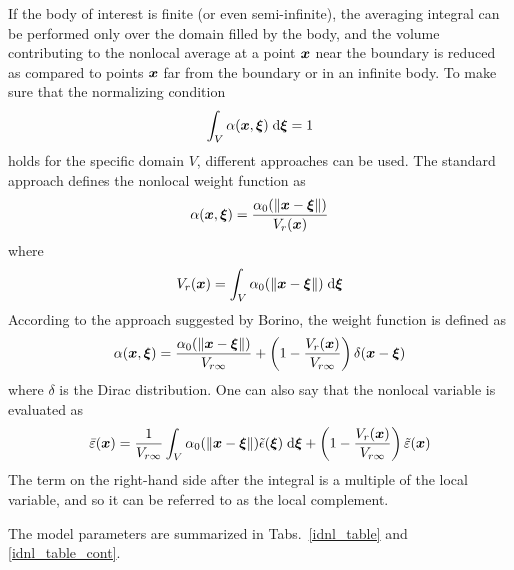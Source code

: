 \documentclass[a4paper]{article}
\newcommand{\mbf}[1]{\mbox{\boldmath$#1$}}
\begin{document}
If the body of interest is finite (or even semi-infinite), the averaging
integral can be performed only over
the domain filled by the body, and the volume contributing to the nonlocal
average at a point $\mbf{x}$ near the boundary is reduced as compared to 
points  $\mbf{x}$ far from the boundary or in an infinite body. To make sure
that the normalizing condition
$$
\int_{V} \alpha(\mbf{x},\mbf{\xi})\;{\rm d}\mbf{\xi} = 1
$$
holds for the specific domain $V$, different approaches can be used.
The standard approach defines the nonlocal weight function as  
$$
\alpha(\mbf{x},\mbf{\xi})=\frac{\alpha_0(\Vert\mbf{x}-\mbf{\xi}\Vert)}{V_r(\mbf{x})}
$$
where
$$
V_r(\mbf{x}) = \int_{V} \alpha_0(\Vert\mbf{x}-\mbf{\xi}\Vert)\;{\rm d}\mbf{\xi} 
$$
According to the approach suggested by Borino, the weight function is defined as
$$
\alpha(\mbf{x},\mbf{\xi})=\frac{\alpha_0(\Vert\mbf{x}-\mbf{\xi}\Vert)}{V_{r\infty}} + \left(1-\frac{V_r(\mbf{x})}{V_{r\infty}}\right)\delta(\mbf{x}-\mbf{\xi})
$$
where $\delta$ is the Dirac distribution. One can also say that the
nonlocal variable is evaluated as
$$
\bar{\varepsilon}(\mbf{x}) = \frac{1}{V_{r\infty}}\int_V\alpha_0(\Vert\mbf{x}-\mbf{\xi}\Vert)\tilde\epsilon(\mbf{\xi})\;{\rm d}\mbf{\xi}+\left(1-\frac{V_r(\mbf{x})}{V_{r\infty}}\right)\tilde\varepsilon(\mbf{x})
$$
The term on the right-hand side after the integral is a multiple of the local
variable, and so it can be referred to as the local complement.  

The model parameters are summarized
in Tabs.~\ref{idnl_table} and \ref{idnl_table_cont}.
\end{document}

